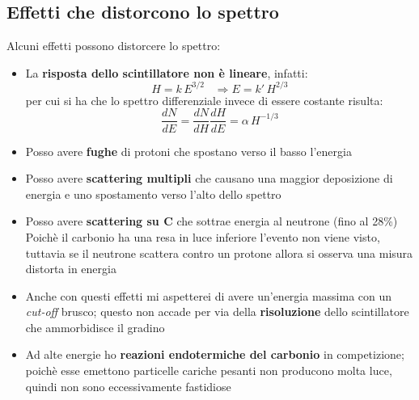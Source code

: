 \subsection{Effetti che distorcono lo spettro}
Alcuni effetti possono distorcere lo spettro:
\begin{itemize}
\item La \textbf{risposta dello scintillatore non \`e lineare}, infatti:
\begin{equation*}
H = k \, E^{3/2} \;\;\; \Rightarrow E = k' \, H^{2/3}
\end{equation*}
per cui si ha che lo spettro differenziale invece di essere costante risulta:
\begin{equation*}
\frac{dN}{dE}=\frac{dN}{dH}\frac{dH}{dE} = \alpha \, H^{-1/3}
\end{equation*}
\item Posso avere \textbf{fughe} di protoni che spostano verso il basso l'energia
\item Posso avere \textbf{scattering multipli} che causano una maggior deposizione di energia e uno spostamento verso l'alto dello spettro
\item Posso avere \textbf{scattering su C} che sottrae energia al neutrone (fino al 28\%)
Poich\`e il carbonio ha una resa in luce inferiore l'evento non viene visto, tuttavia se il neutrone scattera contro un protone allora si osserva
una misura distorta in energia
\item Anche con questi effetti mi aspetterei di avere un'energia massima con un \textit{cut-off} brusco; questo non accade per via della \textbf{risoluzione}
dello scintillatore che ammorbidisce il gradino
\item Ad alte energie ho \textbf{reazioni endotermiche del carbonio} in competizione; poich\`e esse emettono particelle cariche pesanti non producono molta luce,
quindi non sono eccessivamente fastidiose
\end{itemize}
